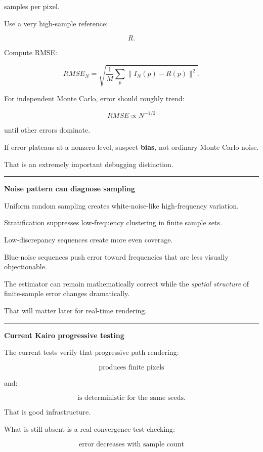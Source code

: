 samples per pixel.

Use a very high-sample reference:

\[
R.
\]

Compute RMSE:

\[
RMSE_N
=
\sqrt{
\frac1M
\sum_p
\|I_N(p)-R(p)\|^2
}.
\]

For independent Monte Carlo, error should roughly trend:

\[
\boxed{
RMSE\propto N^{-1/2}
}
\]

until other errors dominate.

If error plateaus at a nonzero level, suspect \textbf{bias}, not ordinary Monte Carlo noise.

That is an extremely important debugging distinction.

\begin{center}\rule{0.5\linewidth}{0.5pt}\end{center}

\textbf{Noise pattern can diagnose sampling}

Uniform random sampling creates white-noise-like high-frequency variation.

Stratification suppresses low-frequency clustering in finite sample sets.

Low-discrepancy sequences create more even coverage.

Blue-noise sequences push error toward frequencies that are less visually objectionable.

The estimator can remain mathematically correct while the \emph{spatial structure} of finite-sample error changes dramatically.

That will matter later for real-time rendering.

\begin{center}\rule{0.5\linewidth}{0.5pt}\end{center}

\textbf{Current Kairo progressive testing}

The current tests verify that progressive path rendering:

\[
\text{produces finite pixels}
\]

and:

\[
\text{is deterministic for the same seeds}.
\]

That is good infrastructure.

What is still absent is a real convergence test checking:

\[
\text{error decreases with sample count}
\]

